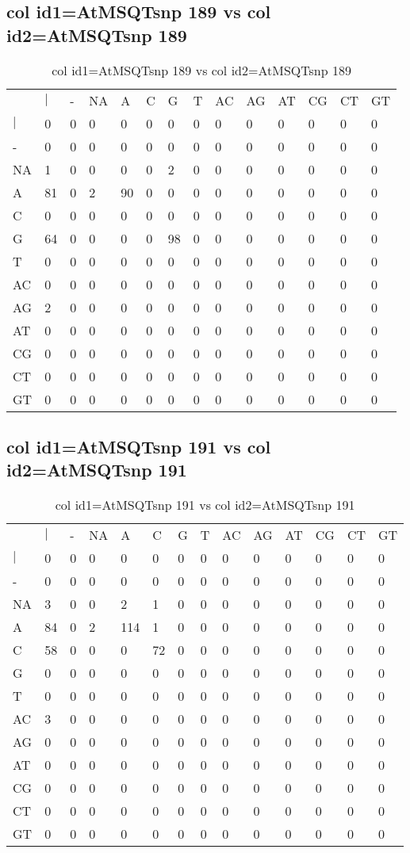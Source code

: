 \subsection{col id1=AtMSQTsnp 189 vs col id2=AtMSQTsnp 189}
\begin{center}
\begin{longtable}{|l|l|l|l|l|l|l|l|l|l|l|l|l|l|}
\caption{col id1=AtMSQTsnp 189 vs col id2=AtMSQTsnp 189} \label{table_dm756}\\
\hline
\\
\hline
&$|$&-&NA&A&C&G&T&AC&AG&AT&CG&CT&GT\\
$|$&0&0&0&0&0&0&0&0&0&0&0&0&0\\
-&0&0&0&0&0&0&0&0&0&0&0&0&0\\
NA&1&0&0&0&0&2&0&0&0&0&0&0&0\\
A&81&0&2&90&0&0&0&0&0&0&0&0&0\\
C&0&0&0&0&0&0&0&0&0&0&0&0&0\\
G&64&0&0&0&0&98&0&0&0&0&0&0&0\\
T&0&0&0&0&0&0&0&0&0&0&0&0&0\\
AC&0&0&0&0&0&0&0&0&0&0&0&0&0\\
AG&2&0&0&0&0&0&0&0&0&0&0&0&0\\
AT&0&0&0&0&0&0&0&0&0&0&0&0&0\\
CG&0&0&0&0&0&0&0&0&0&0&0&0&0\\
CT&0&0&0&0&0&0&0&0&0&0&0&0&0\\
GT&0&0&0&0&0&0&0&0&0&0&0&0&0\\
\hline
\end{longtable}
\end{center}

\subsection{col id1=AtMSQTsnp 191 vs col id2=AtMSQTsnp 191}
\begin{center}
\begin{longtable}{|l|l|l|l|l|l|l|l|l|l|l|l|l|l|}
\caption{col id1=AtMSQTsnp 191 vs col id2=AtMSQTsnp 191} \label{table_dm758}\\
\hline
\\
\hline
&$|$&-&NA&A&C&G&T&AC&AG&AT&CG&CT&GT\\
$|$&0&0&0&0&0&0&0&0&0&0&0&0&0\\
-&0&0&0&0&0&0&0&0&0&0&0&0&0\\
NA&3&0&0&2&1&0&0&0&0&0&0&0&0\\
A&84&0&2&114&1&0&0&0&0&0&0&0&0\\
C&58&0&0&0&72&0&0&0&0&0&0&0&0\\
G&0&0&0&0&0&0&0&0&0&0&0&0&0\\
T&0&0&0&0&0&0&0&0&0&0&0&0&0\\
AC&3&0&0&0&0&0&0&0&0&0&0&0&0\\
AG&0&0&0&0&0&0&0&0&0&0&0&0&0\\
AT&0&0&0&0&0&0&0&0&0&0&0&0&0\\
CG&0&0&0&0&0&0&0&0&0&0&0&0&0\\
CT&0&0&0&0&0&0&0&0&0&0&0&0&0\\
GT&0&0&0&0&0&0&0&0&0&0&0&0&0\\
\hline
\end{longtable}
\end{center}

